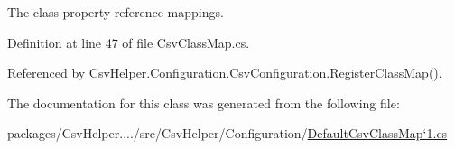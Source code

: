 The class property reference mappings. 



Definition at line 47 of file Csv\-Class\-Map.\-cs.



Referenced by Csv\-Helper.\-Configuration.\-Csv\-Configuration.\-Register\-Class\-Map().



The documentation for this class was generated from the following file\-:\begin{DoxyCompactItemize}
\item 
packages/\-Csv\-Helper..../src/\-Csv\-Helper/\-Configuration/\hyperlink{a00230}{Default\-Csv\-Class\-Map`1.\-cs}\end{DoxyCompactItemize}
